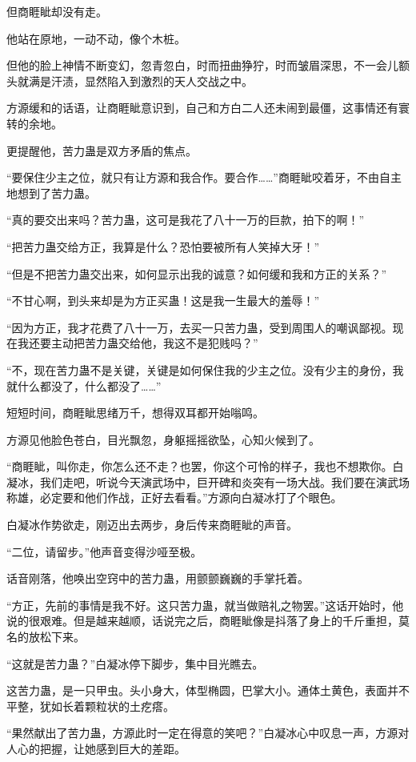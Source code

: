 \begin{this_body}
但商睚眦却没有走。

他站在原地，一动不动，像个木桩。

但他的脸上神情不断变幻，忽青忽白，时而扭曲狰狞，时而皱眉深思，不一会儿额头就满是汗渍，显然陷入到激烈的天人交战之中。

方源缓和的话语，让商睚眦意识到，自己和方白二人还未闹到最僵，这事情还有寰转的余地。

更提醒他，苦力蛊是双方矛盾的焦点。

“要保住少主之位，就只有让方源和我合作。要合作……”商睚眦咬着牙，不由自主地想到了苦力蛊。

“真的要交出来吗？苦力蛊，这可是我花了八十一万的巨款，拍下的啊！”

“把苦力蛊交给方正，我算是什么？恐怕要被所有人笑掉大牙！”

“但是不把苦力蛊交出来，如何显示出我的诚意？如何缓和我和方正的关系？”

“不甘心啊，到头来却是为方正买蛊！这是我一生最大的羞辱！”

“因为方正，我才花费了八十一万，去买一只苦力蛊，受到周围人的嘲讽鄙视。现在我还要主动把苦力蛊交给他，我这不是犯贱吗？”

“不，现在苦力蛊不是关键，关键是如何保住我的少主之位。没有少主的身份，我就什么都没了，什么都没了……”

短短时间，商睚眦思绪万千，想得双耳都开始嗡鸣。

方源见他脸色苍白，目光飘忽，身躯摇摇欲坠，心知火候到了。

“商睚眦，叫你走，你怎么还不走？也罢，你这个可怜的样子，我也不想欺你。白凝冰，我们走吧，听说今天演武场中，巨开碑和炎突有一场大战。我们要在演武场称雄，必定要和他们作战，正好去看看。”方源向白凝冰打了个眼色。

白凝冰作势欲走，刚迈出去两步，身后传来商睚眦的声音。

“二位，请留步。”他声音变得沙哑至极。

话音刚落，他唤出空窍中的苦力蛊，用颤颤巍巍的手掌托着。

“方正，先前的事情是我不好。这只苦力蛊，就当做赔礼之物罢。”这话开始时，他说的很艰难。但是越来越顺，话说完之后，商睚眦像是抖落了身上的千斤重担，莫名的放松下来。

“这就是苦力蛊？”白凝冰停下脚步，集中目光瞧去。

这苦力蛊，是一只甲虫。头小身大，体型椭圆，巴掌大小。通体土黄色，表面并不平整，犹如长着颗粒状的土疙瘩。

“果然献出了苦力蛊，方源此时一定在得意的笑吧？”白凝冰心中叹息一声，方源对人心的把握，让她感到巨大的差距。


\end{this_body}
